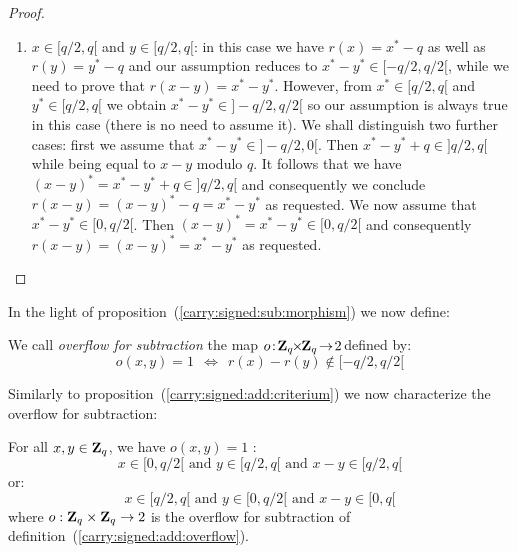\documentclass{article}
\newcommand{\zq}{\mbox{${\bf Z}_{q}$}}
\begin{document}
\begin{proof}
\begin{enumerate}
      while we need to prove that $r(x-y)=x^{*}-y^{*}-q$. 
      However from $x^{*}\in[q/2,q[$ and $y^{*}\in[0,q/2[$ we obtain 
      $x^{*}-y^{*}\in]0,q[$. It follows that $x^{*}-y^{*}\in[q/2,q[$
      while being equal to $x-y$ modulo $q$. Hence we see that 
      $(x-y)^{*}=x^{*}-y^{*}\in[q/2,q[$ and consequently we have
      $r(x-y)=(x-y)^{*}-q=x^{*}-y^{*}-q$ as requested.
    \item $x\in[q/2,q[$ and $y\in[q/2,q[$: in this case we have 
      $r(x)=x^{*}-q$ as well as $r(y)=y^{*}-q$ and our assumption reduces to
      $x^{*}-y^{*}\in[-q/2,q/2[$, while we need to prove that 
      $r(x-y)=x^{*}-y^{*}$. However, from $x^{*}\in[q/2,q[$ and 
      $y^{*}\in[q/2,q[$ we obtain $x^{*}-y^{*}\in]-q/2,q/2[$ so our
      assumption is always true in this case (there is no need to 
      assume it). We shall distinguish two further cases: first 
      we assume that $x^{*}-y^{*}\in]-q/2,0[$. Then $x^{*}-y^{*}+q\in]q/2,q[$
      while being equal to $x-y$ modulo $q$. It follows that we have 
      $(x-y)^{*}= x^{*}-y^{*}+q\in]q/2,q[$ and consequently we conclude
      $r(x-y)=(x-y)^{*}-q=x^{*}-y^{*}$ as requested. We now assume that
      $x^{*}-y^{*}\in[0,q/2[$. Then $(x-y)^{*}=x^{*}-y^{*}\in[0,q/2[$ and
      consequently $r(x-y)=(x-y)^{*}=x^{*}-y^{*}$ as requested.
  \end{enumerate}
\end{proof}
In the light of proposition~(\ref{carry:signed:sub:morphism}) we now define:
\begin{defin}\label{carry:signed:sub:overflow}
We call {\em overflow for subtraction} the map 
$o\!:\!\zq\!\!\times\!\!\zq\!\rightarrow\!2\!$ defined by:
  \[
    o(x,y) = 1  \ \ \Leftrightarrow\ \ r(x)-r(y)\not\in[-q/2,q/2[
  \]
\end{defin}
Similarly to proposition~(\ref{carry:signed:add:criterium}) we now 
characterize the overflow for subtraction:
\begin{prop}\label{carry:signed:sub:criterium}
  For all $x,y\in\zq$, we have $o(x,y)=1$ \ifand:
  \[
    x\in[0,q/2[\mbox{\ and\ }y\in[q/2,q[\mbox{\ and\ }x-y\in[q/2,q[
  \]
or:
  \[
    x\in[q/2,q[\mbox{\ and\ }y\in[0,q/2[\mbox{\ and\ }x-y\in[0,q[
  \]
where $o:\zq\times\zq\rightarrow 2$ is the overflow for subtraction of 
  definition~(\ref{carry:signed:add:overflow}).
\end{prop}
\end{document}

